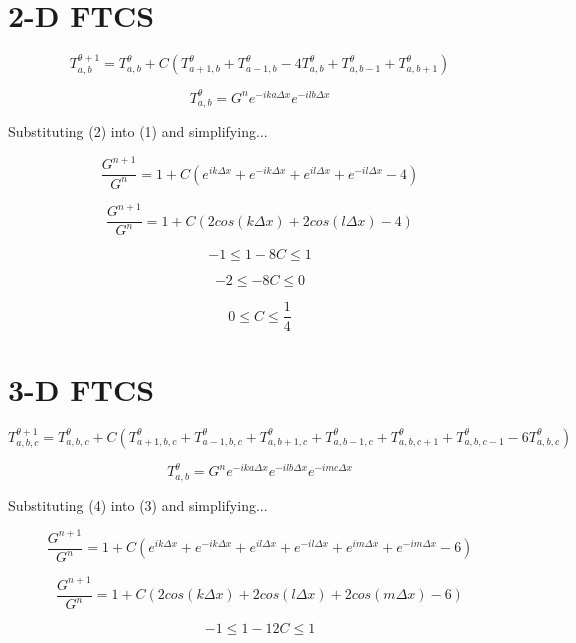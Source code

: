 \documentclass[a4paper,12pt]{article}
\begin{document}
\section{2-D FTCS}

\begin{equation}
T_{a,b}^{\theta+1} = T_{a,b}^{\theta} + C \left(T_{a+1,b}^{\theta}
+ T_{a-1,b}^{\theta} - 4T_{a,b}^{\theta} + T_{a,b-1}^{\theta}
+ T_{a,b+1}^{\theta} \right)
\end{equation}

\begin{equation}
T_{a,b}^{\theta} = G^n e^{-ika\Delta x} e^{-ilb\Delta x}
\end{equation}

Substituting (2) into (1) and simplifying...

\[
\frac{G^{n+1}}{G^n} = 1 + C
\left(
e^{ik\Delta x} + e^{-ik\Delta x}
+ e^{il\Delta x} + e^{-il\Delta x}
- 4
\right)
\]

\[
\frac{G^{n+1}}{G^n} = 1 + C
\left(
2cos(k \Delta x) + 2cos(l \Delta x) -  4
\right)
\]

\[
-1 \leq 1 - 8C \leq 1
\]

\[
-2 \leq - 8C \leq 0
\]

\[
0 \leq C \leq \frac{1}{4}
\]

\pagebreak
\section{3-D FTCS}

\begin{equation}
T_{a,b,c}^{\theta+1} = T_{a,b,c}^{\theta} + C \left(
T_{a+1,b,c}^{\theta}
+ T_{a-1,b,c}^{\theta}
+ T_{a,b+1,c}^{\theta}
+T_{a,b-1,c}^{\theta}
+T_{a,b,c+1}^{\theta}
+T_{a,b,c-1}^{\theta}
- 6T_{a,b,c}^{\theta}
\right)
\end{equation}

\begin{equation}
T_{a,b}^{\theta} = G^n e^{-ika\Delta x} e^{-ilb\Delta x} e^{-imc\Delta x}
\end{equation}

Substituting (4) into (3) and simplifying...

\[
\frac{G^{n+1}}{G^n} = 1 + C
\left(
e^{ik\Delta x} + e^{-ik\Delta x}
+ e^{il\Delta x} + e^{-il\Delta x}
+ e^{im\Delta x} + e^{-im\Delta x}
- 6
\right)
\]

\[
\frac{G^{n+1}}{G^n} = 1 + C
\left(
2cos(k \Delta x) + 2cos(l \Delta x) + 2cos(m \Delta x)- 6
\right)
\]

\[
-1 \leq 1 - 12C \leq 1
\]
\end{document}
